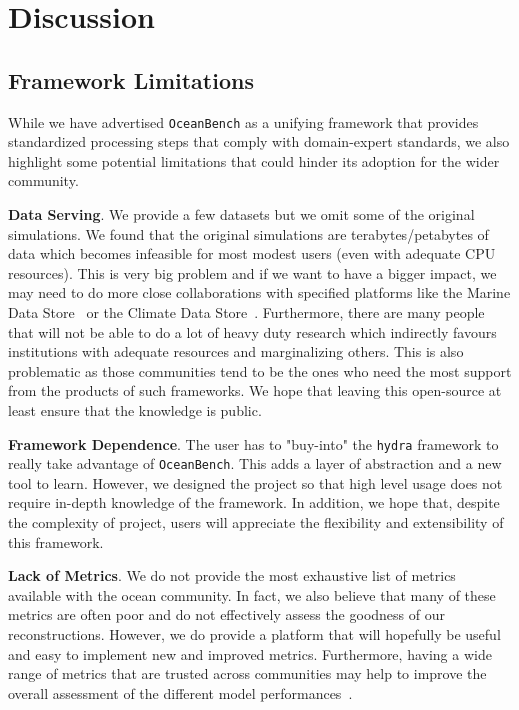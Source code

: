 \section{Discussion} \label{sec:conclusions}
\subsection*{Framework Limitations}

While we have advertised \texttt{OceanBench} as a unifying framework that provides standardized processing steps that comply with domain-expert standards, we also highlight some potential limitations that could hinder its adoption for the wider community.

\textbf{Data Serving}. We provide a few datasets but we omit some of the original simulations. We found that the original simulations are terabytes/petabytes of data which becomes infeasible for most modest users (even with adequate CPU resources).  
This is very big problem and if we want to have a bigger impact, we may need to do more close collaborations with specified platforms like the Marine Data Store~\citep{MDSOCEANPHYSICS,MDSBIOGEOCHEMICAL,MDSOCEANPHYSICSENS,MDSINSITU,MDSWAVES,MDSALONGTRACK,MDSSSH} or the Climate Data Store~\citep{CDSREANALYSISSST,CDSOBSSST,CDSOBSOC,CDSOBSSSTENS}. Furthermore, there are many people that will not be able to do a lot of heavy duty research which indirectly favours institutions with adequate resources and marginalizing others. 
This is also problematic as those communities tend to be the ones who need the most support from the products of such frameworks.
We hope that leaving this open-source at least ensure that the knowledge is public.

\textbf{Framework Dependence}. The user has to "buy-into" the \texttt{hydra} framework to really take advantage of \texttt{OceanBench}. This adds a layer of abstraction and a new tool to learn. 
However, we designed the project so that high level usage does not require in-depth knowledge of the framework. 
In addition, we hope that, despite the complexity of project, users will appreciate the flexibility and extensibility of this framework.


\textbf{Lack of Metrics}. We do not provide the most exhaustive list of metrics available with the ocean community. In fact, we also believe that many of these metrics are often poor and do not effectively assess the goodness of our reconstructions. 
However, we do provide a platform that will hopefully be useful and easy to implement new and improved metrics.
Furthermore, having a wide range of metrics that are trusted across communities may help to improve the overall assessment of the different model performances~\cite{METRICSAVERAGE}.

